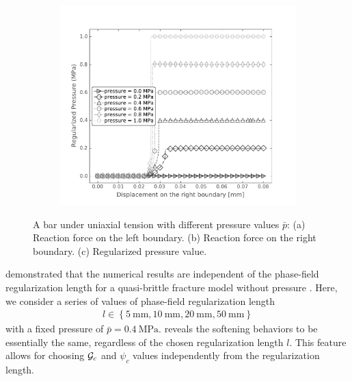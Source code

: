\begin{figure}[htb!]
\begin{subfigure}[t]{0.49\linewidth}
    \label{fig:bar_pressure_right}
  \end{subfigure}
  \begin{subfigure}[t]{0.49\linewidth}
    \centering
    \includegraphics[width=\linewidth]{Chapter3/figures/bar_pressure_only}
    \caption{}
    \label{fig:bar_pressure_only}
  \end{subfigure}
  \caption{\label{fig:bar_pressure_all} A bar under uniaxial tension with different pressure values $\bar{p}$: (a) Reaction force on the left boundary. (b) Reaction force on the right boundary. (c) Regularized pressure value.}
\end{figure}

\citet{JYWu2017} demonstrated that the numerical results are independent of the phase-field regularization length for a quasi-brittle fracture model without pressure \cite{JYWu2017}. Here, we consider a series of values of phase-field regularization length
\begin{align*}
  l \in \left\{ \SI{5}{\milli\meter}, \SI{10}{\milli\meter}, \SI{20}{\milli\meter}, \SI{50}{\milli\meter} \right\}
\end{align*}
with a fixed pressure of $\bar{p}=\SI{0.4}{\mega\pascal}$.  reveals the softening behaviors to be essentially the same, regardless of the chosen regularization length $l$. This feature allows for choosing ${\mathcal{G}_c}$ and $\psi_c$ values independently from the regularization length.

